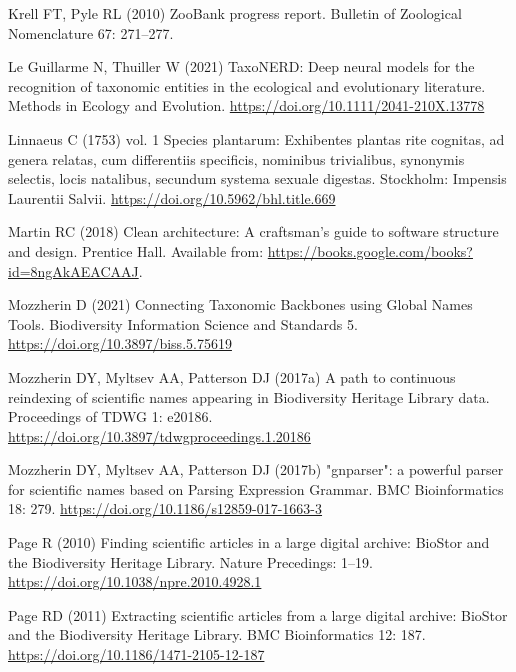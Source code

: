\documentclass[
]{article}
\newlength{\cslhangindent}
\newlength{\cslentryspacingunit} %
\newenvironment{CSLReferences}[2] %
 {%
  \setlength{\parindent}{0pt}
  \ifodd #1
  \let\oldpar\par
  \def\par{\hangindent=\cslhangindent\oldpar}
  \fi
  \setlength{\parskip}{#2\cslentryspacingunit}
 }%
 {}
\begin{document}
\begin{CSLReferences}{1}{0}
\leavevmode{}%
Krell FT, Pyle RL (2010) {ZooBank progress report}. Bulletin of
Zoological Nomenclature 67: 271--277.

\leavevmode{}%
Le Guillarme N, Thuiller W (2021) {TaxoNERD: Deep neural models for the
recognition of taxonomic entities in the ecological and evolutionary
literature}. Methods in Ecology and Evolution.
\url{https://doi.org/10.1111/2041-210X.13778}

\leavevmode{}%
Linnaeus C (1753) vol. 1 Species plantarum: Exhibentes plantas rite
cognitas, ad genera relatas, cum differentiis specificis, nominibus
trivialibus, synonymis selectis, locis natalibus, secundum systema
sexuale digestas. Stockholm: Impensis Laurentii Salvii.
\url{https://doi.org/10.5962/bhl.title.669}

\leavevmode{}%
Martin RC (2018) Clean architecture: A craftsman's guide to software
structure and design. Prentice Hall. Available from:
\url{https://books.google.com/books?id=8ngAkAEACAAJ}.

\leavevmode{}%
Mozzherin D (2021) {Connecting Taxonomic Backbones using Global Names
Tools}. Biodiversity Information Science and Standards 5.
\url{https://doi.org/10.3897/biss.5.75619}

\leavevmode{}%
Mozzherin DY, Myltsev AA, Patterson DJ (2017a) {A path to continuous
reindexing of scientific names appearing in Biodiversity Heritage
Library data}. Proceedings of TDWG 1: e20186.
\url{https://doi.org/10.3897/tdwgproceedings.1.20186}

\leavevmode{}%
Mozzherin DY, Myltsev AA, Patterson DJ (2017b) {"gnparser": a powerful
parser for scientific names based on Parsing Expression Grammar}. BMC
Bioinformatics 18: 279. \url{https://doi.org/10.1186/s12859-017-1663-3}

\leavevmode{}%
Page R (2010) {Finding scientific articles in a large digital archive:
BioStor and the Biodiversity Heritage Library}. Nature Precedings:
1--19. \url{https://doi.org/10.1038/npre.2010.4928.1}

\leavevmode{}%
Page RD (2011) {Extracting scientific articles from a large digital
archive: BioStor and the Biodiversity Heritage Library}. BMC
Bioinformatics 12: 187. \url{https://doi.org/10.1186/1471-2105-12-187}


\end{CSLReferences}
\end{document}
